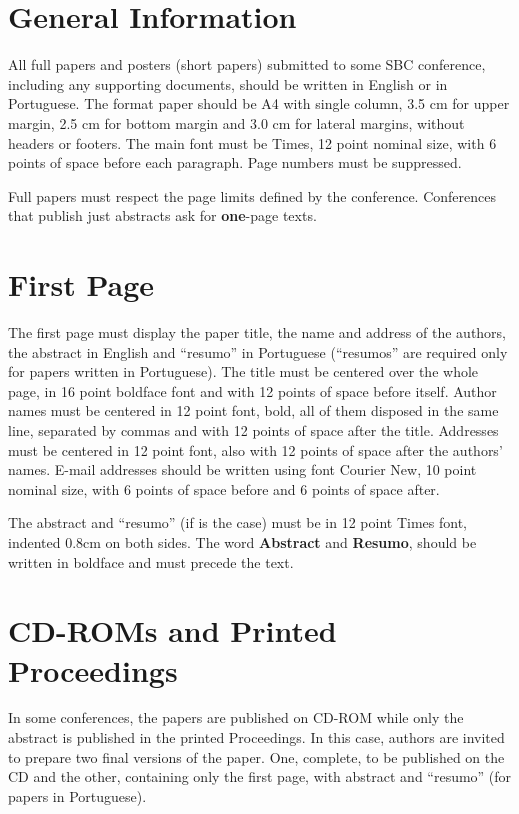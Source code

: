 \documentclass[12pt]{article}
\begin{document}
\section{General Information}

All full papers and posters (short papers) submitted to some SBC conference,
including any supporting documents, should be written in English or in
Portuguese. The format paper should be A4 with single column, 3.5 cm for upper
margin, 2.5 cm for bottom margin and 3.0 cm for lateral margins, without
headers or footers. The main font must be Times, 12 point nominal size, with 6
points of space before each paragraph. Page numbers must be suppressed.

Full papers must respect the page limits defined by the conference.
Conferences that publish just abstracts ask for \textbf{one}-page texts.

\section{First Page} \label{sec:firstpage}

The first page must display the paper title, the name and address of the
authors, the abstract in English and ``resumo'' in Portuguese (``resumos'' are
required only for papers written in Portuguese). The title must be centered
over the whole page, in 16 point boldface font and with 12 points of space
before itself. Author names must be centered in 12 point font, bold, all of
them disposed in the same line, separated by commas and with 12 points of
space after the title. Addresses must be centered in 12 point font, also with
12 points of space after the authors' names. E-mail addresses should be
written using font Courier New, 10 point nominal size, with 6 points of space
before and 6 points of space after.

The abstract and ``resumo'' (if is the case) must be in 12 point Times font,
indented 0.8cm on both sides. The word \textbf{Abstract} and \textbf{Resumo},
should be written in boldface and must precede the text.

\section{CD-ROMs and Printed Proceedings}

In some conferences, the papers are published on CD-ROM while only the
abstract is published in the printed Proceedings. In this case, authors are
invited to prepare two final versions of the paper. One, complete, to be
published on the CD and the other, containing only the first page, with
abstract and ``resumo'' (for papers in Portuguese).
\end{document}
